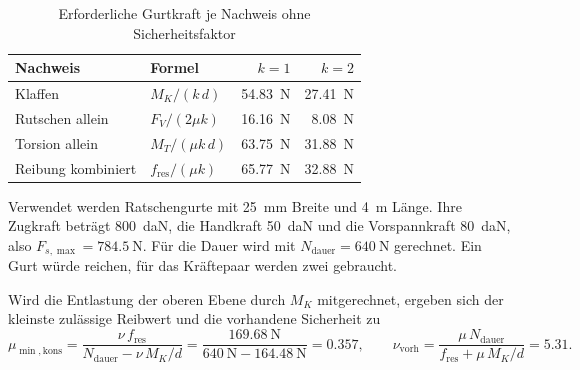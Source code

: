 \begin{table}[H]
    \centering
    \caption{Erforderliche Gurtkraft je Nachweis ohne Sicherheitsfaktor}
    \label{tab:mech-nachweise}
    \begin{tabular}{llrr}
        \toprule
        \textbf{Nachweis} & \textbf{Formel} & \textbf{$k = 1$} & \textbf{$k = 2$} \\
        \midrule
        Klaffen            & $M_K/(k\,d)$                & \SI{54,83}{\newton} & \SI{27,41}{\newton} \\
        Rutschen allein    & $F_V/(2\mu k)$              & \SI{16,16}{\newton} & \SI{8,08}{\newton} \\
        Torsion allein     & $M_T/(\mu k\,d)$            & \SI{63,75}{\newton} & \SI{31,88}{\newton} \\
        Reibung kombiniert & $f_{\mathrm{res}}/(\mu k)$  & \SI{65,77}{\newton} & \SI{32,88}{\newton} \\
        \bottomrule
    \end{tabular}
\end{table}

Verwendet werden Ratschengurte mit \SI{25}{\milli\metre} Breite und \SI{4}{\metre} Länge. Ihre Zugkraft beträgt \SI{800}{daN}, die Handkraft \SI{50}{daN} und die Vorspannkraft \SI{80}{daN}, also $F_{s,\max} = \SI{784,5}{\newton}$. Für die Dauer wird mit $N_{\mathrm{dauer}} = \SI{640}{\newton}$ gerechnet.  Ein Gurt würde reichen, für das Kräftepaar werden zwei gebraucht.

Wird die Entlastung der oberen Ebene durch $M_K$ mitgerechnet, ergeben sich der kleinste zulässige Reibwert und die vorhandene Sicherheit zu
\begin{equation}
    \mu_{\min,\mathrm{kons}} = \frac{\nu \, f_{\mathrm{res}}}{N_{\mathrm{dauer}} - \nu \, M_K/d}
    = \frac{\SI{169,68}{\newton}}{\SI{640}{\newton} - \SI{164,48}{\newton}} = \num{0,357},
    \qquad
    \nu_{\mathrm{vorh}} = \frac{\mu \, N_{\mathrm{dauer}}}{f_{\mathrm{res}} + \mu \, M_K/d} = \num{5,31} .
    \label{eq:mech-kons}
\end{equation}

